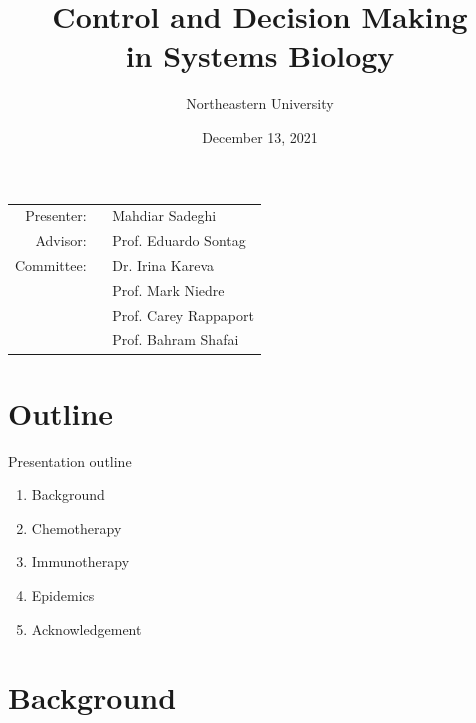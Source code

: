 \documentclass[10pt]{beamer}
\title[Proposal Review]{Control and Decision Making \\ in Systems Biology}
\author{Northeastern University}
\date{December 13, 2021}
\begin{document}
\begin{frame}
	\maketitle
	\small \hspace{3cm}
	{\begin{tabular}{r@{}l}
			Presenter: \ & Mahdiar Sadeghi \\
			Advisor:   \  & Prof. Eduardo Sontag \\
			Committee: \  & Dr. Irina Kareva \\
			& Prof. Mark Niedre \\
			& Prof. Carey Rappaport \\
			& Prof. Bahram Shafai
		\end{tabular}
	}
\end{frame}

\section{Outline}

\begin{frame}{Presentation outline}
	\vspace{15pt}
    \begin{enumerate}
    	\item Background
    	\item Chemotherapy
    	\item Immunotherapy
    	\item Epidemics
    	\item Acknowledgement
    \end{enumerate}
\end{frame}

\section{Background}
\end{document}
